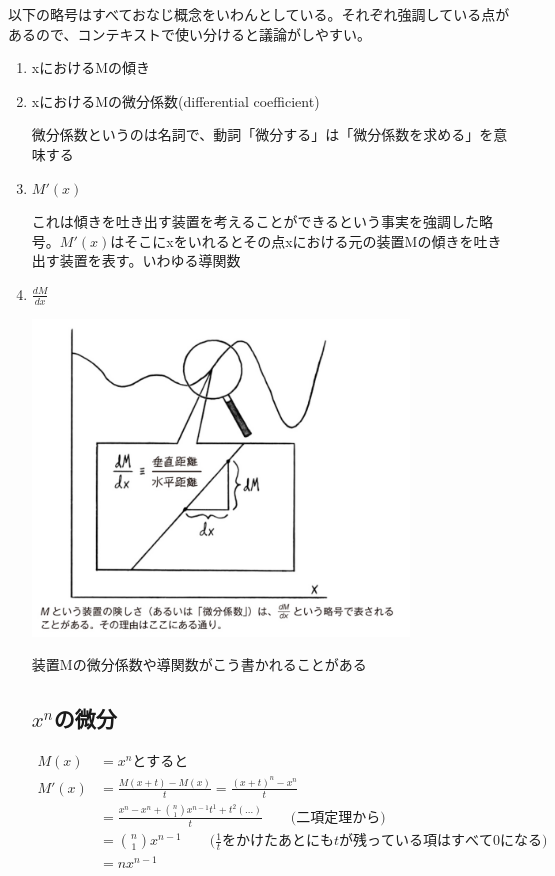 \documentclass[dvipdfmx]{jsarticle}
\begin{document}
以下の略号はすべておなじ概念をいわんとしている。それぞれ強調している点があるので、コンテキストで使い分けると議論がしやすい。
\begin{enumerate}
 \item xにおけるMの傾き

 \item xにおけるMの微分係数(differential coefficient)

微分係数というのは名詞で、動詞「微分する」は「微分係数を求める」を意味する

 \item $M'(x)$

 これは傾きを吐き出す装置を考えることができるという事実を強調した略号。$M'(x)$はそこにxをいれるとその点xにおける元の装置Mの傾きを吐き出す装置を表す。いわゆる導関数

 \item $\frac{dM}{dx}$

 \includegraphics[width=10cm]{images/burn_math_2-2.png}

 装置Mの微分係数や導関数がこう書かれることがある

\subsection{$x^n$の微分}
\begin{align*}
M(x) &= x^n とすると \\
M'(x) &= \frac{M(x+t)-M(x)}{t} = \frac{(x+t)^n - x^n}{t} \\
&= \frac{x^n - x^n + \binom {n}{1}x^{n-1}t^1 + t^2(...)}{t} \qquad \text{(二項定理から)} \\
&=  \binom{n}{1} x^{n-1} \qquad \text{($\frac{1}{t}をかけたあとにもtが残っている項はすべて0になる$)} \\
&= nx^{n-1}
\end{align*}


\end{enumerate}
\end{document}
